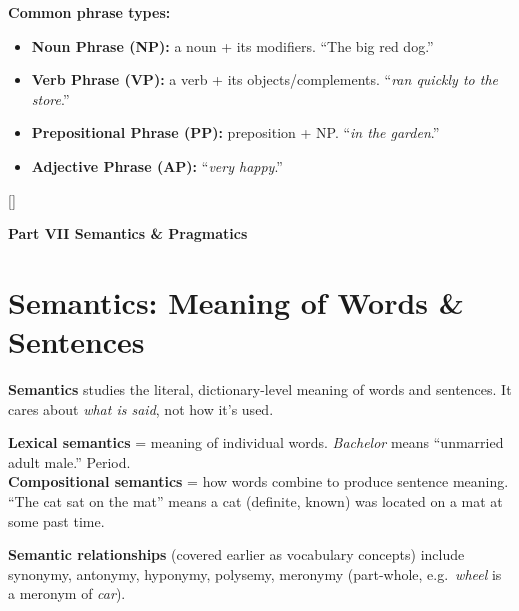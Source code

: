 \documentclass[11pt, letterpaper]{article}
\newcommand{\greysections}{%
  \titleformat{\section}{\large\bfseries\color{sectiongrey}}{}{0em}{}[\color{sectiongrey}\titlerule]%
  \titleformat{\subsection}{\normalsize\bfseries\color{sectiongrey!80!black}}{}{0em}{}%
}
\newcommand{\partbanner}[3]{%
  \begin{tcolorbox}[colback=#1, colframe=#2, boxrule=1.2pt, arc=4pt,
    left=8pt, right=8pt, top=6pt, bottom=6pt]
    \begin{center}{\LARGE\bfseries #3}\end{center}
  \end{tcolorbox}%
}
\begin{document}
\textbf{Common phrase types:}
\begin{itemize}[noitemsep]
  \item \textbf{Noun Phrase (NP):} a noun + its modifiers. ``The big red dog.''
  \item \textbf{Verb Phrase (VP):} a verb + its objects/complements. ``\emph{ran quickly to the store}.''
  \item \textbf{Prepositional Phrase (PP):} preposition + NP. ``\emph{in the garden}.''
  \item \textbf{Adjective Phrase (AP):} ``\emph{very happy}.''
\end{itemize}

\newpage

\greysections
{}
\partbanner{part7bg}{sectiongrey}{Part VII \quad Semantics \& Pragmatics}

\vspace{8pt}

\section*{Semantics: Meaning of Words \& Sentences}

\textbf{Semantics} studies the literal, dictionary-level meaning of words and sentences. It cares about \emph{what is said}, not how it's used.

\textbf{Lexical semantics} = meaning of individual words. \emph{Bachelor} means ``unmarried adult male.'' Period.\\
\textbf{Compositional semantics} = how words combine to produce sentence meaning. ``The cat sat on the mat'' means a cat (definite, known) was located on a mat at some past time.

\textbf{Semantic relationships} (covered earlier as vocabulary concepts) include synonymy, antonymy, hyponymy, polysemy, meronymy (part-whole, e.g.\ \emph{wheel} is a meronym of \emph{car}).
\end{document}
